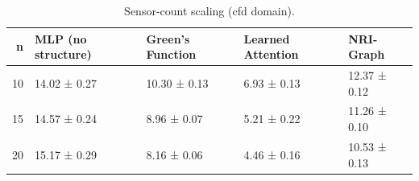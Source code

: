 \begin{table}
\caption{Sensor-count scaling (cfd domain).}
\label{tab:sensor-scaling-cfd}
\begin{tabular}{rllll}
\toprule
n & MLP (no structure) & Green's Function & Learned Attention & NRI-Graph \\
\midrule
10 & 14.02 ± 0.27 & 10.30 ± 0.13 & 6.93 ± 0.13 & 12.37 ± 0.12 \\
15 & 14.57 ± 0.24 & 8.96 ± 0.07 & 5.21 ± 0.22 & 11.26 ± 0.10 \\
20 & 15.17 ± 0.29 & 8.16 ± 0.06 & 4.46 ± 0.16 & 10.53 ± 0.13 \\
\bottomrule
\end{tabular}
\end{table}
